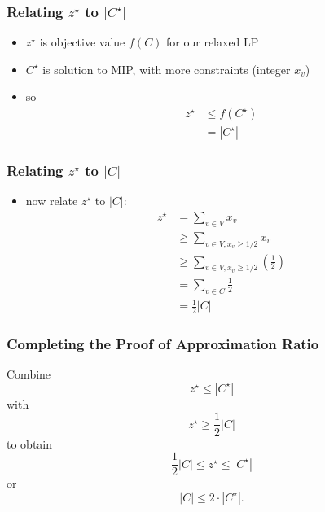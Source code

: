 \documentclass{beamer}
\begin{document}
\begin{frame} \frametitle{Relating $z^\star$ to $|C^\star|$}
  \begin{itemize}
    \item $z^\star$ is objective value $f(C)$ for our relaxed LP
    \item $C^\star$ is solution to MIP, with more constraints (integer $x_v$)
    \item so
      \begin{align*}
        z^\star &\leq f(C^\star) \\
          &= |C^\star|
      \end{align*}
  \end{itemize}
\end{frame}

\begin{frame} \frametitle{Relating $z^\star$ to $|C|$}
  \begin{itemize}
    \item now relate $z^\star$ to $|C|:$
      \begin{align*}
        z^\star &= \sum_{v \in V} x_v \\
          &\geq \sum_{v \in V, x_v \geq 1/2} x_v \\
          &\geq \sum_{v \in V, x_v \geq 1/2} (\frac{1}{2}) \\
          &= \sum_{v \in C} \frac{1}{2} \\
          &= \frac{1}{2} |C|
      \end{align*}
\end{itemize}
\end{frame}

\begin{frame} \frametitle{Completing the Proof of Approximation Ratio}
  Combine
  \[ z^\star \leq |C^\star| \]
  with
  \[ z^\star \geq \frac{1}{2} |C| \]
  to obtain
  \[ \frac{1}{2} |C| \leq z^\star \leq |C^\star| \]
  or
  \[ |C| \leq 2 \cdot |C^\star| . \]
\end{frame}
\end{document}

